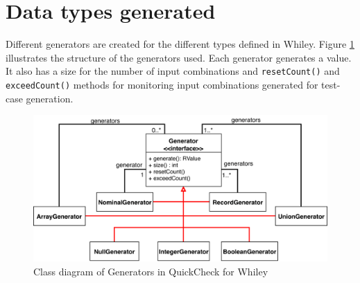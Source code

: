 \section{Data types generated}
Different generators are created for the different types defined in Whiley. 
Figure \ref{fig:qc-generators} illustrates the structure of the generators used.
Each generator generates a value. It also has a size for the number of input combinations and \texttt{resetCount()} and \texttt{exceedCount()} methods for monitoring input combinations generated for test-case generation.
 
\begin{figure}
	\caption{Class diagram of Generators in QuickCheck for Whiley}
	\label{fig:qc-generators}
	\includegraphics[width=\textwidth]{qc-generators}
	\centering
\end{figure}




